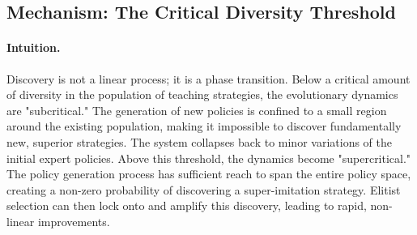 \subsection{Mechanism: The Critical Diversity Threshold}
\paragraph{Intuition.} Discovery is not a linear process; it is a phase transition. Below a critical amount of diversity in the population of teaching strategies, the evolutionary dynamics are "subcritical." The generation of new policies is confined to a small region around the existing population, making it impossible to discover fundamentally new, superior strategies. The system collapses back to minor variations of the initial expert policies. Above this threshold, the dynamics become "supercritical." The policy generation process has sufficient reach to span the entire policy space, creating a non-zero probability of discovering a super-imitation strategy. Elitist selection can then lock onto and amplify this discovery, leading to rapid, non-linear improvements.

